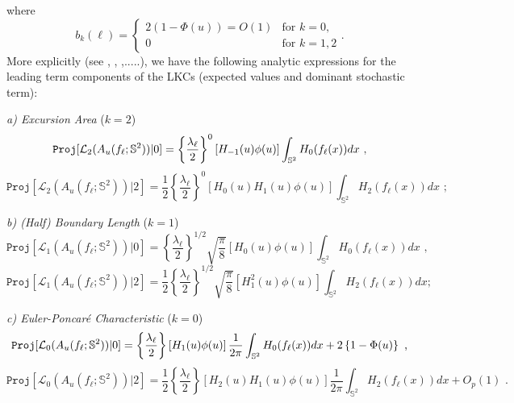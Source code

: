 \documentclass[aps,prd,showpacs,superscriptaddress,groupedaddress]{revtex4-1}  %
\begin{document}
where 
\begin{equation*}
b_{k}(\ell )=\left\{ 
\begin{array}{cc}
2(1-\Phi (u))=O(1) & \text{for }k=0, \\ 
0 & \text{for }k=1,2%
\end{array}%
\right. .
\end{equation*}%
More explicitly (see \cite{DI}, \cite{MR2015}, \cite{ROSSI2015},.....), we have the following analytic expressions for the leading term components of the LKCs (expected values and dominant stochastic term):

\emph{a) Excursion Area} ($k=2$)%
\begin{equation*}
\mathtt{Proj}[\mathcal{L}_{2}(A_{u}(f_{\ell };\mathbb{S}^{2}))|0]=\left\{ 
\frac{\lambda _{\ell }}{2}\right\} ^{0}\left[ H_{-1}(u)\phi (u)\right] \int_{%
\mathbb{S}^{2}}H_{0}(f_{\ell }(x))dx\text{ ,}
\end{equation*}%
\begin{equation*}
\mathtt{Proj}[\mathcal{L}_{2}(A_{u}(f_{\ell };\mathbb{S}^{2}))|2]=\frac{1}{2}%
\left\{ \frac{\lambda _{\ell }}{2}\right\} ^{0}\left[ H_{0}(u)H_{1}(u)\phi
(u)\right] \int_{\mathbb{S}^{2}}H_{2}(f_{\ell }(x))dx\text{ ;}
\end{equation*}

\emph{b) (Half) Boundary Length} ($k=1$)%
\begin{equation*}
\mathtt{Proj}[\mathcal{L}_{1}(A_{u}(f_{\ell };\mathbb{S}^{2}))|0]=\left\{ 
\frac{\lambda _{\ell }}{2}\right\} ^{1/2}\sqrt{\frac{\pi }{8}}\left[
H_{0}(u)\phi (u)\right] \int_{\mathbb{S}^{2}}H_{0}(f_{\ell }(x))dx\text{ ,}
\end{equation*}%
\begin{equation*}
\mathtt{Proj}[\mathcal{L}_{1}(A_{u}(f_{\ell };\mathbb{S}^{2}))|2]=\frac{1}{2}%
\left\{ \frac{\lambda _{\ell }}{2}\right\} ^{1/2}\sqrt{\frac{\pi }{8}}\left[
H_{1}^{2}(u)\phi (u)\right] \int_{\mathbb{S}^{2}}H_{2}(f_{\ell }(x))dx\text{
;}
\end{equation*}

\emph{c) Euler-Poncar\'{e} Characteristic} ($k=0$)%
\begin{equation*}
\mathtt{Proj}[\mathcal{L}_{0}(A_{u}(f_{\ell };\mathbb{S}^{2}))|0]=\left\{ 
\frac{\lambda _{\ell }}{2}\right\} \left[ H_{1}(u)\phi (u)\right] \frac{1}{%
2\pi }\int_{\mathbb{S}^{2}}H_{0}(f_{\ell }(x))dx+2\left\{ 1-\Phi (u)\right\} 
\text{ ,}
\end{equation*}%
\begin{equation*}
\mathtt{Proj}[\mathcal{L}_{0}(A_{u}(f_{\ell };\mathbb{S}^{2}))|2]=\frac{1}{2}%
\left\{ \frac{\lambda _{\ell }}{2}\right\} \left[ H_{2}(u)H_{1}(u)\phi (u)%
\right] \frac{1}{2\pi }\int_{\mathbb{S}^{2}}H_{2}(f_{\ell }(x))dx+O_{p}(1)%
\text{ .}
\end{equation*}%
\end{document}
